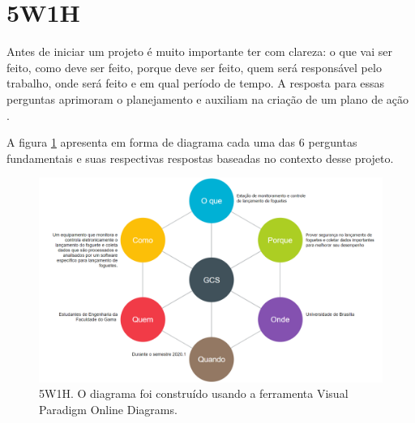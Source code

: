 \section{5W1H}

Antes de iniciar um projeto é muito importante ter com clareza: o que vai ser feito, como deve ser feito, porque deve ser feito, quem será responsável pelo trabalho, onde será feito e em qual período de tempo. A resposta para essas perguntas aprimoram o planejamento e auxiliam na criação de um plano de ação \cite{5w1hUFMG}.

A figura \ref{fig:5w1h} apresenta em forma de diagrama cada uma das 6 perguntas fundamentais e suas respectivas respostas baseadas no contexto desse projeto.

\begin{figure}[H]
  \centering
  \includegraphics[width=\textwidth,height=\textheight,keepaspectratio]{figuras/5w1h.png}
  \caption{5W1H. O diagrama foi construído usando a ferramenta Visual Paradigm Online Diagrams.} 
  \label{fig:5w1h}
\end{figure}
